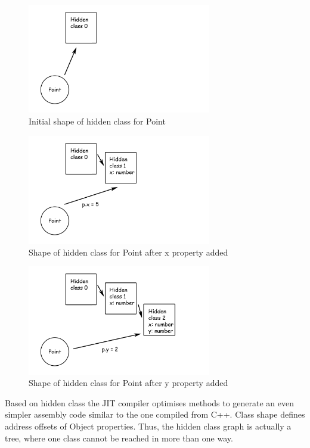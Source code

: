 \begin{figure}[h!]
  \caption{Initial shape of hidden class for Point}
  \label{img:point0}
  \centering
	\includegraphics[width=8cm]{point0}
\end{figure}
\begin{figure}[h!]
  \caption{Shape of hidden class for Point after x property added}
  \label{img:point1}
  \centering
	\includegraphics[width=8cm]{point1}
\end{figure}
\begin{figure}[h!]
  \caption{Shape of hidden class for Point after y property added}
  \label{img:point2}
  \centering
	\includegraphics[width=8cm]{point2}
\end{figure}

Based on hidden class the JIT compiler optimises methods to generate an even simpler assembly code similar to the one compiled from C++. Class shape defines address offsets of Object properties. Thus, the hidden class graph is actually a tree, where one class cannot be reached in more than one way.

